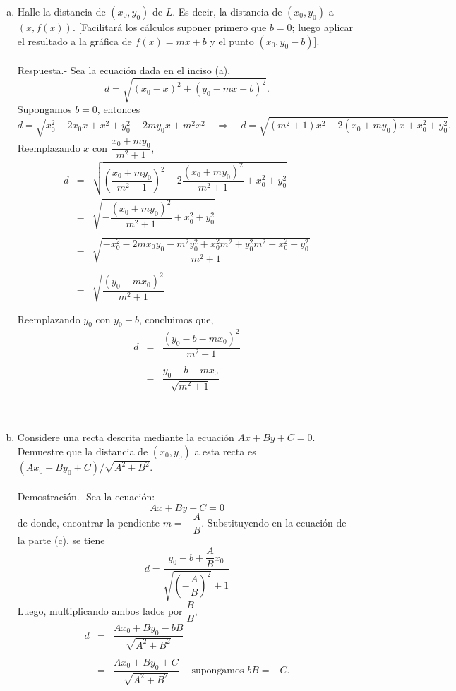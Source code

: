\begin{enumerate}[\bfseries 1.]
\begin{enumerate}[(a)]
	    \item Halle la distancia de $(x_0,y_0)$ de $L$. Es decir, la distancia de $(x_0,y_0)$ a $\left(\overline{x},f(\overline{x})\right)$. [Facilitará los cálculos suponer primero que $b=0$; luego aplicar el resultado a la gráfica de $f(x)=mx+b$ y el punto $(x_0,y_0-b)$].\\\\
		Respuesta.-\; Sea la ecuación dada en el inciso (a),
		$$d=\sqrt{\left(x_0-x\right)^2+\left(y_0-mx-b\right)^2}.$$
		Supongamos $b=0$, entonces
		$$d=\sqrt{x_0^2-2x_0x+x^2+y_0^2-2my_0x+m^2x^2}\quad \Rightarrow \quad d=\sqrt{\left(m^2+1\right)x^2-2\left(x_0+my_0\right)x+x_0^2+y_0^2}.$$
		Reemplazando $x$ con $\dfrac{x_0+my_0}{m^2+1}$,
		$$\begin{array}{rcl}
		    d&=&\sqrt{\left(\dfrac{x_0+my_0}{m^2+1}\right)^2-2\dfrac{\left(x_0+my_0\right)^2}{m^2+1}+x_0^2+y_0^2}\\
		     &=&\sqrt{-\dfrac{\left(x_0+my_0\right)^2}{m^2+1}+x_0^2+y_0^2}\\\\
		     &=&\sqrt{\dfrac{-x_0^2-2mx_0y_0-m^2y_0^2+x_0^2m^2+y_0^2m^2+x_0^2+y_0^2}{m^2+1}}\\\\
		     &=&\sqrt{\dfrac{\left(y_0-mx_0\right)^2}{m^2+1}}\\\\
		\end{array}$$
		Reemplazando $y_0$ con $y_0-b$, concluimos que,
		$$\begin{array}{rcl}
		    d&=&\dfrac{\left(y_0-b-mx_0\right)^2}{m^2+1}\\\\
		     &=&\dfrac{y_0-b-mx_0}{\sqrt{m^2+1}}
		\end{array}$$
		\vspace{0.5cm}\\\\

	    \item Considere una recta descrita mediante la ecuación $Ax+By+C=0$. Demuestre que la distancia de $\left(x_0,y_0\right)$ a esta recta es $\left(Ax_0+By_0+C\right)/\sqrt{A^2+B^2}$.\\\\
		Demostración.-\; Sea la ecuación:
		$$Ax+By+C=0$$
		de donde, encontrar la pendiente $m=-\dfrac{A}{B}.$
		Substituyendo en la ecuación de la parte (c), se tiene
		$$d=\dfrac{y_0-b+\dfrac{A}{B}x_0}{\sqrt{\left(-\dfrac{A}{B}\right)^2}+1}$$
		Luego, multiplicando ambos lados por $\dfrac{B}{B}$,
		$$\begin{array}{rcll}
		    d&=&\dfrac{Ax_0+By_0-bB}{\sqrt{A^2+B^2}}&\\\\
		     &=&\dfrac{Ax_0+By_0+C}{\sqrt{A^2+B^2}}&\mbox{supongamos } bB=-C.
		\end{array}$$
		\vspace{0.5cm}\\\\


\end{enumerate}
\end{enumerate}
